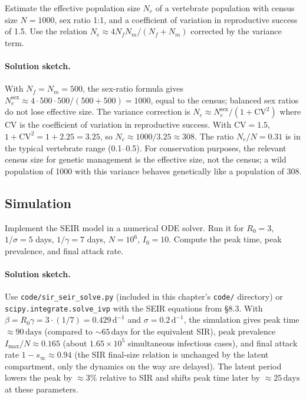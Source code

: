 \begin{exercise}
Estimate the effective population size $N_e$ of a vertebrate
population with census size $N = 1000$, sex ratio 1:1, and a
coefficient of variation in reproductive success of 1.5. Use the
relation $N_e \approx 4 N_f N_m / (N_f + N_m)$ corrected by the
variance term.

\paragraph{Solution sketch.} With $N_f = N_m = 500$, the sex-ratio
formula gives $N_e^{\mathrm{sex}} \approx 4 \cdot 500 \cdot 500/
(500 + 500) = 1000$, equal to the census; balanced sex ratios do
not lose effective size. The variance correction is
$N_e \approx N_e^{\mathrm{sex}}/(1 + \mathrm{CV}^2)$ where CV is the
coefficient of variation in reproductive success. With $\mathrm{CV}
= 1.5$, $1 + \mathrm{CV}^2 = 1 + 2.25 = 3.25$, so
$N_e \approx 1000/3.25 \approx 308$. The ratio $N_e/N = 0.31$ is
in the typical vertebrate range (0.1--0.5). For conservation
purposes, the relevant census size for genetic management is the
effective size, not the census; a wild population of 1000 with
this variance behaves genetically like a population of 308.
\end{exercise}

\subsection*{Simulation}

\begin{exercise}
Implement the SEIR model in a numerical ODE solver. Run it for
$R_0 = 3$, $1/\sigma = 5$ days, $1/\gamma = 7$ days, $N = 10^6$,
$I_0 = 10$. Compute the peak time, peak prevalence, and final
attack rate.

\paragraph{Solution sketch.} Use \texttt{code/sir\_seir\_solve.py}
(included in this chapter's \texttt{code/} directory) or
\texttt{scipy.integrate.solve\_ivp} with the SEIR equations from
§8.3. With $\beta = R_0 \gamma = 3 \cdot (1/7) = 0.429\,
\text{d}^{-1}$ and $\sigma = 0.2\,\text{d}^{-1}$, the simulation
gives peak time $\approx 90\,\text{days}$ (compared to $\sim 65\,
\text{days}$ for the equivalent SIR), peak prevalence
$I_{\max}/N \approx 0.165$ (about $1.65 \times 10^5$ simultaneous
infectious cases), and final attack rate $1 - s_\infty \approx
0.94$ (the SIR final-size relation is unchanged by the latent
compartment, only the dynamics on the way are delayed). The latent
period lowers the peak by $\approx 3\%$ relative to SIR and shifts
peak time later by $\approx 25\,\text{days}$ at these parameters.
\end{exercise}

